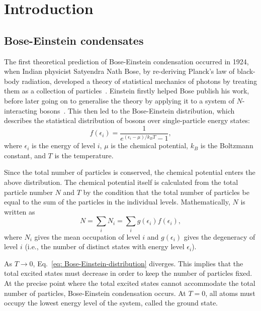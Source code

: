\chapter{Introduction}\label{chap: intro}


\section{Bose-Einstein condensates}
The first theoretical prediction of Bose-Einstein condensation occurred in 1924,
when Indian physicist Satyendra Nath Bose, by re-deriving Planck's law of
black-body radiation, developed a theory of statistical mechanics of photons
by treating them as a collection of particles~\cite{Bose1924}.
Einstein firstly helped Bose publish his work, before later going on to
generalise the theory by applying it to a system of \(N\)-interacting
bosons~\cite{Einstein2005}.
This then led to the Bose-Einstein distribution, which describes the
statistical distribution of bosons over single-particle energy states:
\begin{equation}\label{eq: Bose-Einstein-distribution}
    f(\epsilon_i) = \frac{1}{e^{(\epsilon_i-\mu)/k_B T} - 1},
\end{equation}
where \(\epsilon_i\) is the energy of level \(i\), \(\mu \) is the chemical
potential, \(k_B\) is the Boltzmann constant, and \(T\) is the temperature.

Since the total number of particles is conserved, the chemical potential enters
the above distribution.
The chemical potential itself is calculated from the total particle number \(N\)
and \(T\) by the condition that the total number of particles be equal to the
sum of the particles in the individual levels.
Mathematically, \(N\) is written as
\begin{equation}
    N = \sum_i N_i = \sum_i g(\epsilon_i)f(\epsilon_i),
\end{equation}
where \(N_i\) gives the mean occupation of level \(i\) and \(g(\epsilon_i)\)
gives the degeneracy of level \(i\) (i.e., the number of distinct states with
energy level \(\epsilon_i\)).

As \(T \rightarrow 0\), Eq.~\eqref{eq: Bose-Einstein-distribution} diverges.
This implies that the total excited states must decrease in order to keep
the number of particles fixed.
At the precise point where the total excited states cannot accommodate the total
number of particles, Bose-Einstein condensation occurs.
At \(T=0\), all atoms must occupy the lowest energy level of the system, called
the ground state.

